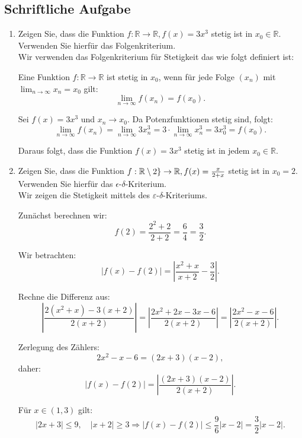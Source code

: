 \documentclass[a4paper]{article}
\begin{document}
\subsection{Schriftliche Aufgabe}
\begin{enumerate}[label=({\alph*})]
    \item Zeigen Sie, dass die Funktion $f: \mathbb{R} \to \mathbb{R}, f(x) = 3x^3$ stetig ist in $x_0 \in\mathbb{R}$. Verwenden Sie hierfür das Folgenkriterium.\\
    Wir verwenden das Folgenkriterium für Stetigkeit das wie folgt definiert ist:

    Eine Funktion \( f: \mathbb{R} \to \mathbb{R} \) ist stetig in \( x_0 \), wenn für jede Folge \( (x_n) \) mit \( \lim_{n \to \infty} x_n = x_0 \) gilt:
    \[
    \lim_{n \to \infty} f(x_n) = f(x_0).
    \]
    
    Sei \( f(x) = 3x^3 \) und \( x_n \to x_0 \). Da Potenzfunktionen stetig sind, folgt:
    \[
    \lim_{n \to \infty} f(x_n) = \lim_{n \to \infty} 3x_n^3 = 3 \cdot \lim_{n \to \infty} x_n^3 = 3x_0^3 = f(x_0).
    \]

    Daraus folgt, dass die Funktion \( f(x) = 3x^3 \) stetig ist in jedem \( x_0 \in \mathbb{R} \).
    \item Zeigen Sie, dass die Funktion $f: \mathbb{R} \setminus \-2\}\to\mathbb{R}, f(x) =\frac{x}{2+x}$ stetig ist in $x_0 = 2$. Verwenden Sie hierfür das $\epsilon$-$\delta$-Kriterium.\\
    Wir zeigen die Stetigkeit mittels des \(\varepsilon\)-\(\delta\)-Kriteriums.

    Zunächst berechnen wir:
    \[
    f(2) = \frac{2^2 + 2}{2 + 2} = \frac{6}{4} = \frac{3}{2}.
    \]
    
    Wir betrachten:
    \[
    \left| f(x) - f(2) \right| = \left| \frac{x^2 + x}{x + 2} - \frac{3}{2} \right|.
    \]
    
    Rechne die Differenz aus:
    \[
    \left| \frac{2(x^2 + x) - 3(x + 2)}{2(x + 2)} \right| = \left| \frac{2x^2 + 2x - 3x - 6}{2(x + 2)} \right| = \left| \frac{2x^2 - x - 6}{2(x + 2)} \right|.
    \]
    
    Zerlegung des Zählers:
    \[
    2x^2 - x - 6 = (2x + 3)(x - 2),
    \]
    daher:
    \[
    \left| f(x) - f(2) \right| = \left| \frac{(2x + 3)(x - 2)}{2(x + 2)} \right|.
    \]
    
    Für \( x \in (1, 3) \) gilt:
    \[
    |2x + 3| \leq 9, \quad |x + 2| \geq 3 \Rightarrow \left| f(x) - f(2) \right| \leq \frac{9}{6} |x - 2| = \frac{3}{2} |x - 2|.
    \]
    

\end{enumerate}
\end{document}
